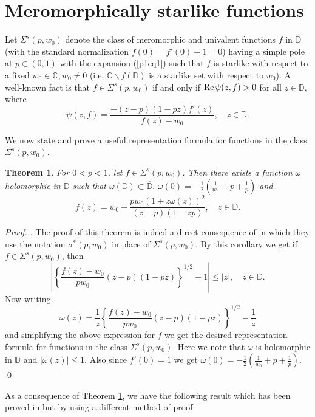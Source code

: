 \documentclass[leqno,
12pt]{amsart}
\newtheorem{thm}{Theorem}[section]
\theoremstyle{definition}
\newcounter {own}
\newenvironment{pf}[1][]{ \vskip 3mm
 \noindent
 \ifthenelse{\equal{#1}{}}  {{\slshape Proof. }}  {{\slshape #1.} } }{\qed\bigskip}
\begin{document}
\section{Meromorphically starlike functions}\label{sec1-bpw3}
Let $\Sigma^s(p,w_0)$ denote the class of
meromorphic and univalent functions $f$ in ${{\mathbb D}}$ (with the standard
normalization $f(0)=f'(0)-1=0$) having a simple pole
at $p\in (0,1)$ with the expansion (\ref{p1eq1}) such that $f$ is starlike
with respect to a fixed
$w_0\in {{\mathbb C}}, w_0\neq 0$ (i.e.  $\overline{{\mathbb C}}\backslash f({{\mathbb D}})$ is a starlike
set with respect to $w_0$).
A well-known fact is that \cite{Living-94} $f\in\Sigma^s(p,w_0)$
if and only if ${\rm Re}\,\psi(z,f) >0$ for all $z\in {{\mathbb D}}$, where
\begin{equation}\label{p1eq20}
\psi(z,f) =\frac{-(z-p)(1-pz)f'(z)}{f(z)-w_0},\quad z\in {{\mathbb D}}.
\end{equation}

We now state and prove a useful representation formula for functions
in the class $\Sigma^s(p, w_0)$.

\begin{thm}\label{1th5}
For $0<p<1$, let $f\in \Sigma^s(p, w_0)$. Then there exists a function
$\omega$ holomorphic in ${{\mathbb D}}$ such that
$\omega({{\mathbb D}})\subset \overline {{\mathbb D}},\, \omega(0)= -\frac{1}{2} (\frac{1}{w_0}+p+\frac{1}{p})$
and
\begin{equation}\label{p1eq22}
f(z)= w_0 + \frac{pw_0(1+z\omega(z))^2}{(z-p)(1-zp)},\quad z\in {{\mathbb D}}.
\end{equation}
\end{thm}\begin{pf}
The proof of this theorem is indeed a direct consequence of \cite[Corollary 2]{Zhang-92}
in which they use the notation $\sigma^*(p, w_0)$ in place of $\Sigma^s(p, w_0)$.
By this corollary we get if $f\in \Sigma^s(p, w_0)$, then
$$\left|\left\{\frac{f(z)-w_0}{pw_0}(z-p)(1-pz)\right\}^{1/2}-1\right|\leq |z| ,\quad z\in {{\mathbb D}}.
$$
Now writing
$$
\omega(z)= \frac{1}{z}\left\{\frac{f(z)-w_0}{pw_0}(z-p)(1-pz)\right\}^{1/2}-\frac{1}{z}
$$
and simplifying the above expression for $f$ we get the desired
representation formula for functions in the class $\Sigma^s(p, w_0)$. Here we note
that $ \omega$ is holomorphic in ${{\mathbb D}}$ and $| \omega(z)|\leq 1$. Also since $f'(0)=1$
we get $\omega(0)= -\frac{1}{2} (\frac{1}{w_0}+p+\frac{1}{p})$.
\end{pf}

As a consequence of Theorem \ref{1th5}, we have the following result
which has been proved in \cite{Chang-88} but by using a different method of
proof.
\end{document}
